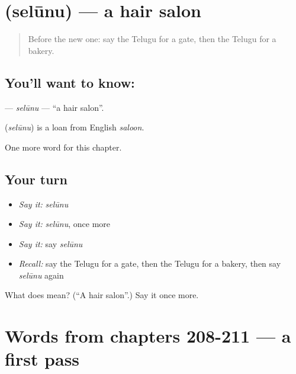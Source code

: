 \section[\texorpdfstring{\te{సెలూను} (selūnu)}{సెలూను (selūnu)}]{ (selūnu) — a hair salon}

\label{lesson:TE-C216-selunu}



\begin{quote}
Before the new one: say the Telugu for a gate, then the Telugu for a bakery.
\end{quote}

\subsection*{You'll want to know: }
\textbf{} — \emph{selūnu} — \textquotedblleft{}a hair salon\textquotedblright{}.

\begin{cousinweb}
\textbf{} (\emph{selūnu}) is a loan from English \emph{saloon}.
\end{cousinweb}

\begin{grammarlens}[title={What you've built}]
One more word for this chapter.
\end{grammarlens}

\subsection*{Your turn}
\begin{itemize}
\raggedright
  \item \emph{Say it:} \emph{selūnu}
  \item \emph{Say it:} \emph{selūnu}, once more
  \item \emph{Say it:} say \emph{selūnu}
  \item \emph{Recall:} say the Telugu for a gate, then the Telugu for a bakery, then say \emph{selūnu} again
\end{itemize}

\begin{tcolorbox}[breakable,colback=teal!4,colframe=teal!35!black,title={Before you move on}]
What does  mean? (\textquotedblleft{}A hair salon\textquotedblright{}.) Say it once more.
\end{tcolorbox}
\section[(dialogue)]{Words from chapters 208-211 — a first pass}

